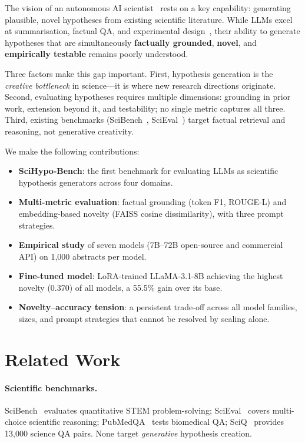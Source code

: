 \documentclass{article}
\begin{document}
The vision of an autonomous AI scientist~\cite{wang2023scientific,lu2024ai}
rests on a key capability: generating plausible, novel hypotheses from
existing scientific literature.
While LLMs excel at summarisation, factual QA, and experimental
design~\cite{birhane2023science}, their ability to generate hypotheses that
are simultaneously \textbf{factually grounded}, \textbf{novel}, and
\textbf{empirically testable} remains poorly understood.

Three factors make this gap important.
First, hypothesis generation is the \emph{creative bottleneck} in
science---it is where new research directions originate.
Second, evaluating hypotheses requires multiple dimensions: grounding in
prior work, extension beyond it, and testability; no single metric captures
all three.
Third, existing benchmarks (SciBench~\cite{wang2023scibench},
SciEval~\cite{sun2024scieval}) target factual retrieval and reasoning, not
generative creativity.

We make the following contributions:

\begin{itemize}[leftmargin=*, itemsep=2pt, topsep=2pt]
\item \textbf{SciHypo-Bench}: the first benchmark for evaluating LLMs as
  scientific hypothesis generators across four domains.
\item \textbf{Multi-metric evaluation}: factual grounding (token F1, ROUGE-L)
  and embedding-based novelty (FAISS cosine dissimilarity), with three prompt
  strategies.
\item \textbf{Empirical study} of seven models (7B--72B open-source and
  commercial API) on 1{,}000 abstracts per model.
\item \textbf{Fine-tuned model}: LoRA-trained LLaMA-3.1-8B achieving the
  highest novelty (0.370) of all models, a 55.5\% gain over its base.
\item \textbf{Novelty--accuracy tension}: a persistent trade-off across all
  model families, sizes, and prompt strategies that cannot be resolved by
  scaling alone.
\end{itemize}

\section{Related Work}
\label{sec:related}

\paragraph{Scientific benchmarks.}
SciBench~\cite{wang2023scibench} evaluates quantitative STEM problem-solving;
SciEval~\cite{sun2024scieval} covers multi-choice scientific reasoning;
PubMedQA~\cite{jin2019pubmedqa} tests biomedical QA; SciQ~\cite{welbl2017crowdsourcing}
provides 13{,}000 science QA pairs.
None target \emph{generative} hypothesis creation.
\end{document}
